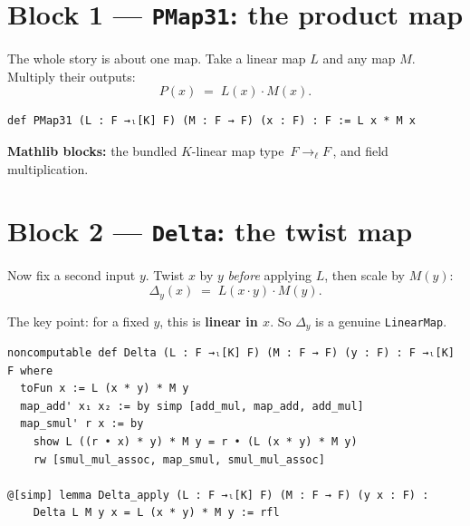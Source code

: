 \documentclass[11pt]{article}
\begin{document}
\section{Block 1 --- \texttt{PMap31}: the product map}

The whole story is about one map.
Take a linear map $L$ and any map $M$.
Multiply their outputs:
\[
  P(x) \;=\; L(x)\cdot M(x).
\]

\begin{center}
\end{center}

\begin{lstlisting}
def PMap31 (L : F →ₗ[K] F) (M : F → F) (x : F) : F := L x * M x
\end{lstlisting}

\textbf{Mathlib blocks:} the bundled $K$-linear map type \,$F \to_{\ell} F$\,, and field multiplication.

\section{Block 2 --- \texttt{Delta}: the twist map}

Now fix a second input $y$.
Twist $x$ by $y$ \emph{before} applying $L$, then scale by $M(y)$:
\[
  \Delta_y(x) \;=\; L(x\cdot y)\cdot M(y).
\]

The key point: for a fixed $y$, this is \textbf{linear in $x$}.
So $\Delta_y$ is a genuine \texttt{LinearMap}.

\begin{center}
\end{center}

\begin{lstlisting}
noncomputable def Delta (L : F →ₗ[K] F) (M : F → F) (y : F) : F →ₗ[K] F where
  toFun x := L (x * y) * M y
  map_add' x₁ x₂ := by simp [add_mul, map_add, add_mul]
  map_smul' r x := by
    show L ((r • x) * y) * M y = r • (L (x * y) * M y)
    rw [smul_mul_assoc, map_smul, smul_mul_assoc]

@[simp] lemma Delta_apply (L : F →ₗ[K] F) (M : F → F) (y x : F) :
    Delta L M y x = L (x * y) * M y := rfl
\end{lstlisting}
\end{document}
